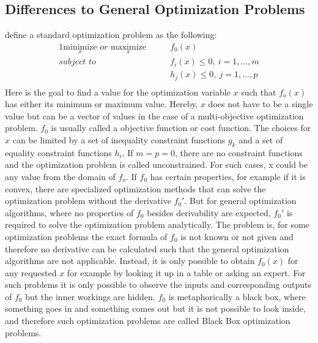 \subsection{Differences to General Optimization Problems}
\label{sec:theory:optimization:differences}
\textcite{Boyd-Optimization} define a standard optimization problem as the following:
\begin{alignat*}{1}
    \underset{x}{\mathrm{minimize}} \textit{ or } \underset{x}{\mathrm{maximize}} \qquad & f_0(x)\\
    \textit{subject to} \qquad & f_i(x) \leq 0,\> i=1,...,m\\
                        &  h_j(x) \leq 0,\> j=1,...,p\\
\end{alignat*}
Here is the goal to find a value for the optimization variable $x$ such that $f_o(x)$ has either its minimum or maximum value.
Hereby, $x$ does not have to be a single value but can be a vector of values in the case of a multi-objective optimization problem.
$f_0$ is usually called a objective function or cost function.
The choices for $x$ can be limited by a set of inequality constraint functions $g_k$ and a set of equality constraint functions $h_i$.
If $m=p=0$, there are no constraint functions and the optimization problem is called unconstrained.
For such cases, x could be any value from the domain of $f_o$.\newline
If $f_0$ has certain properties, for example if it is convex, there are specialized optimization methods that can solve the optimization problem without the derivative $f_0'$.
But for general optimization algorithms, where no properties of $f_0$ besides derivability are expected, $f_0'$ is required to solve the optimization problem analytically.\newline
The problem is, for some optimization problems the exact formula of $f_0$ is not known or not given and therefore no derivative can be calculated such that the general optimization algorithms are not applicable.
Instead, it is only possible to obtain $f_0(x)$ for any requested $x$ for example by looking it up in a table or asking an expert.
For such problems it is only possible to observe the inputs and corresponding outputs of $f_0$ but the inner workings are hidden.
$f_0$ is metaphorically a black box, where something goes in and something comes out but it is not possible to look inside, and therefore such optimization problems are called Black Box optimization problems.

